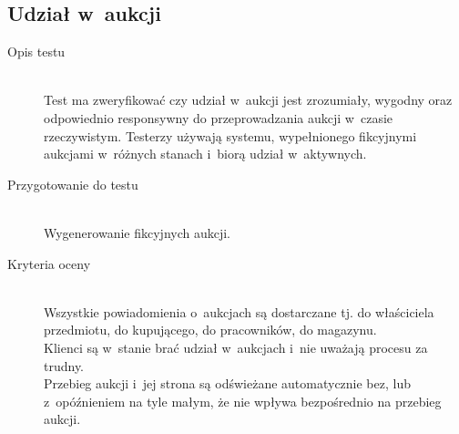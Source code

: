 \documentclass[10pt,a4paper]{article}
\begin{document}
\subsection{Udział w~aukcji}
\begin{description}
  \item[Opis testu] \hfill \\
    Test ma zweryfikować czy udział w~aukcji jest zrozumiały, wygodny oraz
    odpowiednio responsywny do przeprowadzania aukcji w~czasie rzeczywistym.
    Testerzy używają systemu, wypełnionego fikcyjnymi aukcjami w~różnych
    stanach i~biorą udział w~aktywnych.
  \item[Przygotowanie do testu] \hfill \\
    Wygenerowanie fikcyjnych aukcji.
  \item[Kryteria oceny] \hfill \\
    Wszystkie powiadomienia o~aukcjach są dostarczane tj. do właściciela
    przedmiotu, do kupującego, do pracowników, do magazynu.\\
    Klienci są w~stanie brać udział w~aukcjach i~nie uważają procesu za
    trudny.\\
    Przebieg aukcji i~jej strona są odświeżane automatycznie bez, lub
    z~opóźnieniem na tyle małym, że nie wpływa bezpośrednio na przebieg aukcji.
\end{description}
\end{document}
